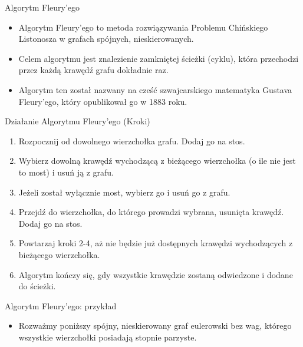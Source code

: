 \documentclass[polish,envcountsect,10pt]{beamer}
\begin{document}
\begin{frame}{Algorytm Fleury'ego}
    \begin{itemize}
      \item Algorytm Fleury'ego to metoda rozwiązywania Problemu Chińskiego Listonosza w grafach spójnych, nieskierowanych.
      \item Celem algorytmu jest znalezienie zamkniętej ścieżki (cyklu), która przechodzi przez każdą krawędź grafu dokładnie raz.
      \item Algorytm ten został nazwany na cześć szwajcarskiego matematyka Gustava Fleury'ego, który opublikował go w 1883 roku.
    \end{itemize}
\end{frame}

\begin{frame}{Działanie Algorytmu Fleury'ego (Kroki)}
    \begin{enumerate}
        \item Rozpocznij od dowolnego wierzchołka grafu. Dodaj go na stos.
        \item Wybierz dowolną krawędź wychodzącą z bieżącego wierzchołka (o ile nie jest to most)  i usuń ją z grafu.
        \item Jeżeli został wyłącznie most, wybierz go i usuń go z grafu.
        \item Przejdź do wierzchołka, do którego prowadzi wybrana, usunięta krawędź. Dodaj go na stos.
        \item Powtarzaj kroki 2-4, aż nie będzie już dostępnych krawędzi wychodzących z bieżącego wierzchołka.
        \item Algorytm kończy się, gdy wszystkie krawędzie zostaną odwiedzone i dodane do ścieżki.
    \end{enumerate}
\end{frame}

\begin{frame}{Algorytm Fleury'ego: przykład}
    \begin{itemize}
          \item Rozważmy poniższy spójny, nieskierowany graf eulerowski bez wag, którego wszystkie wierzchołki posiadają stopnie parzyste.
    \end{itemize}
    \begin{center}
    \end{center}
\end{frame}
    
\end{document}

